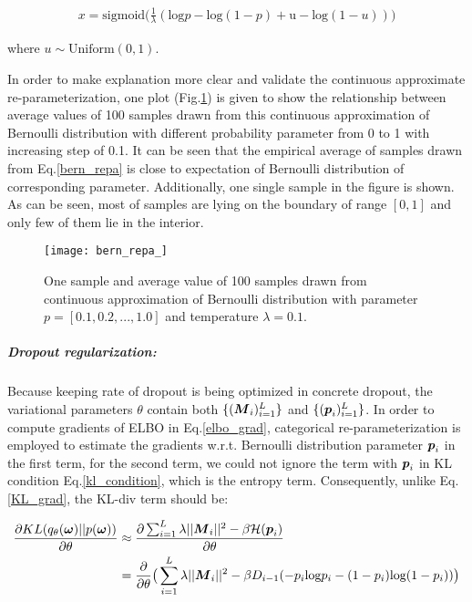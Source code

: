 \begin{equation}\label{bern_repa}
\begin{aligned}
x = \text{sigmoid}\big(
\frac{1}{\lambda} (\text{log}p - \text{log}(1-p) + \text{u} - \text{log}(1-u)) 
\big)
\end{aligned}
\end{equation}

where $u \sim \text{Uniform}(0,1)$. 

In order to make explanation more clear and validate the continuous approximate re-parameterization, one plot (Fig.\ref{fig:bern_repa}) is given to show the relationship between average values of 100 samples drawn from this continuous approximation of Bernoulli distribution with different probability parameter from 0 to 1 with increasing step of 0.1. It can be seen that the empirical average of samples drawn from Eq.\ref{bern_repa} is close to expectation of Bernoulli distribution of corresponding parameter. Additionally, one single sample in the figure is shown. As can be seen, most of samples are lying on the boundary of range $[0,1]$ and only few of them lie in the interior.
\begin{figure}[h!]
	\begin{center}
		\texttt{[image: bern\_repa\_]}
		\caption{One sample and average value of 100 samples drawn from continuous approximation of Bernoulli distribution with parameter $p = [0.1, 0.2, ..., 1.0]$ and temperature $ \lambda =0.1$.}		
		\label{fig:bern_repa}
	\end{center}
\end{figure}

\subparagraph{Dropout regularization:}
Because keeping rate of dropout is being optimized in concrete dropout, the variational parameters $\theta$ contain both $\{ (\boldsymbol M_i)_{i=1}^{L} \}$ and $\{(\boldsymbol p_i)_{i=1}^{L} \}$. In order to compute gradients of ELBO in Eq.\ref{elbo_grad}, categorical re-parameterization is employed to estimate the gradients w.r.t. Bernoulli distribution parameter $\boldsymbol p_i$ in the first term, for the second term, we could not ignore the term with $\boldsymbol p_i$ in KL condition Eq.\ref{kl_condition}, which is the entropy term. Consequently, unlike Eq.\ref{KL_grad}, the \gls{KL-div} term should be:

\begin{equation} 
\begin{aligned}\label{KL_grad_concrete}
\frac{\partial KL(q_{\theta}(\boldsymbol \omega)||p(\boldsymbol \omega))}{\partial \theta} 
&\approx \frac{\partial \sum_{i=1}^{L}\lambda||\boldsymbol M_{i}||^{2}- \beta\mathcal H(\boldsymbol p_{i})}{\partial \theta}  \\
&= \frac{\partial}{\partial \theta} \big( \sum_{i=1}^{L}\lambda||\boldsymbol M_{i}||^{2}- \beta D_{i-1}(-p_{i}\text{log}p_{i} - (1-p_{i})\text{log}(1-p_{i}))\big)
\end{aligned}
\end{equation}

